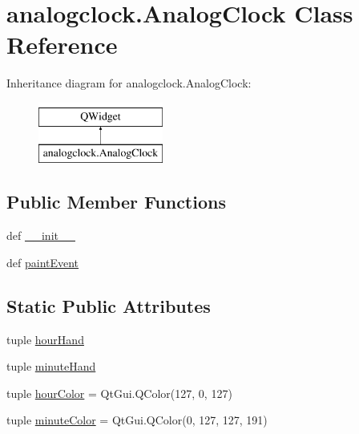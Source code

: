 \hypertarget{classanalogclock_1_1AnalogClock}{}\section{analogclock.\+Analog\+Clock Class Reference}
\label{classanalogclock_1_1AnalogClock}
Inheritance diagram for analogclock.\+Analog\+Clock\+:\begin{figure}[H]
\begin{center}
\leavevmode
\includegraphics[height=2.000000cm]{classanalogclock_1_1AnalogClock}
\end{center}
\end{figure}
\subsection*{Public Member Functions}
\begin{DoxyCompactItemize}
\item 
def \hyperlink{classanalogclock_1_1AnalogClock_a2e1bf77b8a4c2ef0a8f7195e25f21bcd}{\+\_\+\+\_\+init\+\_\+\+\_\+}
\item 
def \hyperlink{classanalogclock_1_1AnalogClock_af6bd9ae039992eafa28aaabf5dc68ab3}{paint\+Event}
\end{DoxyCompactItemize}
\subsection*{Static Public Attributes}
\begin{DoxyCompactItemize}
\item 
tuple \hyperlink{classanalogclock_1_1AnalogClock_aec808658ddb5edfa02d5071ee9080c92}{hour\+Hand}
\item 
tuple \hyperlink{classanalogclock_1_1AnalogClock_a082bdde729509852c8c1ea9f37405527}{minute\+Hand}
\item 
tuple \hyperlink{classanalogclock_1_1AnalogClock_aacce5fc84431002d5bab1ccbcbbaf6d5}{hour\+Color} = Qt\+Gui.\+Q\+Color(127, 0, 127)
\item 
tuple \hyperlink{classanalogclock_1_1AnalogClock_acd823721a1d3496fae27926bb1a621b6}{minute\+Color} = Qt\+Gui.\+Q\+Color(0, 127, 127, 191)
\end{DoxyCompactItemize}



